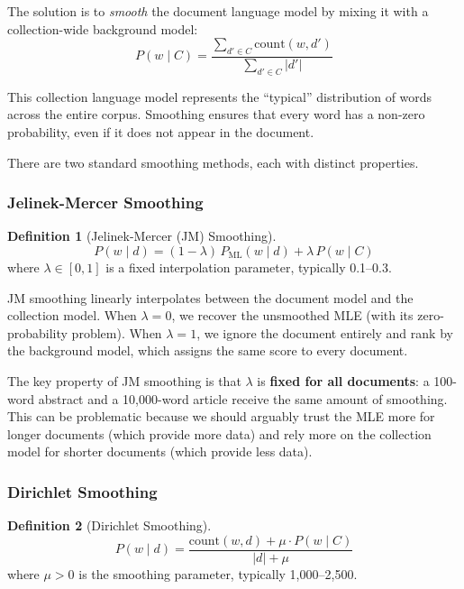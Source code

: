 \documentclass[11pt,a4paper]{article}
\theoremstyle{definition}
\newtheorem{definition}{Definition}[section]
\theoremstyle{plain}
\begin{document}
The solution is to \emph{smooth} the document language model by mixing it with a collection-wide background model:
\begin{equation}
P(w \mid C) = \frac{\sum_{d' \in C} \text{count}(w, d')}{\sum_{d' \in C} |d'|}
\end{equation}

This collection language model represents the ``typical'' distribution of words across the entire corpus. Smoothing ensures that every word has a non-zero probability, even if it does not appear in the document.

There are two standard smoothing methods, each with distinct properties.

\subsubsection{Jelinek-Mercer Smoothing}

\begin{definition}[Jelinek-Mercer (JM) Smoothing]
\begin{equation}
P(w \mid d) = (1 - \lambda)\, P_\text{ML}(w \mid d) + \lambda\, P(w \mid C)
\end{equation}
where $\lambda \in [0, 1]$ is a fixed interpolation parameter, typically 0.1--0.3.
\end{definition}

JM smoothing linearly interpolates between the document model and the collection model. When $\lambda = 0$, we recover the unsmoothed MLE (with its zero-probability problem). When $\lambda = 1$, we ignore the document entirely and rank by the background model, which assigns the same score to every document.

The key property of JM smoothing is that $\lambda$ is \textbf{fixed for all documents}: a 100-word abstract and a 10{,}000-word article receive the same amount of smoothing. This can be problematic because we should arguably trust the MLE more for longer documents (which provide more data) and rely more on the collection model for shorter documents (which provide less data).

\subsubsection{Dirichlet Smoothing}

\begin{definition}[Dirichlet Smoothing]
\begin{equation}
P(w \mid d) = \frac{\text{count}(w, d) + \mu \cdot P(w \mid C)}{|d| + \mu}
\end{equation}
where $\mu > 0$ is the smoothing parameter, typically 1{,}000--2{,}500.
\end{definition}
\end{document}

